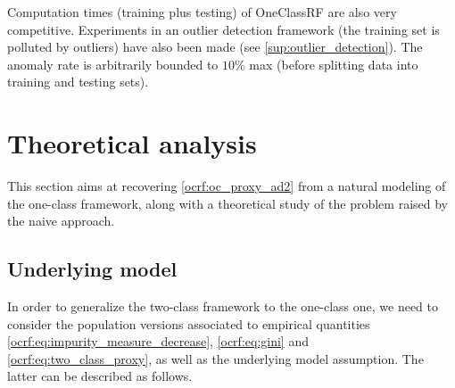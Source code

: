 Computation times (training plus testing) of \ac{OneClassRF} are also very
competitive. 
%
%
%
%
Experiments in an outlier detection framework (the training set is polluted by
outliers) have also been made (see \cref{sup:outlier_detection}).
The anomaly rate is arbitrarily bounded to $10\%$ max (before splitting data
into training and testing sets).
%
%
%
%
\section{Theoretical analysis} 
\label{sec:ocrf:theory}
This section aims at recovering \cref{ocrf:oc_proxy_ad2} from a natural
modeling of the one-class framework, along with a theoretical study of the
problem raised by the naive approach.
\subsection{Underlying model}
\label{ocrf:sec:model} In order to generalize the two-class framework to the
one-class one, we need to consider the population versions associated to
empirical quantities \cref{ocrf:eq:impurity_measure_decrease},
\cref{ocrf:eq:gini} and \cref{ocrf:eq:two_class_proxy}, as well as the
underlying model assumption. The latter can be described as follows.

